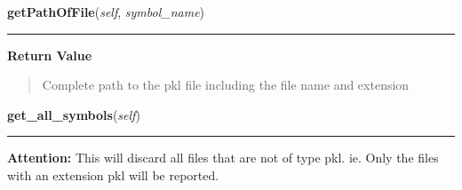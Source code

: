     \vspace{0.5ex}

\hspace{.8\funcindent}\begin{boxedminipage}{\funcwidth}

    \raggedright \textbf{getPathOfFile}(\textit{self}, \textit{symbol\_name})

    \vspace{-1.5ex}

    \rule{\textwidth}{0.5\fboxrule}
\setlength{\parskip}{2ex}
\setlength{\parskip}{1ex}
      \textbf{Return Value}
    \vspace{-1ex}

      \begin{quote}
      Complete path to the pkl file including the file name and extension

      \end{quote}

    \end{boxedminipage}

    \label{trunk:qstkutil:DataAccess:DataAccess:get_all_symbols}

    \vspace{0.5ex}

\hspace{.8\funcindent}\begin{boxedminipage}{\funcwidth}

    \raggedright \textbf{get\_all\_symbols}(\textit{self})

    \vspace{-1.5ex}

    \rule{\textwidth}{0.5\fboxrule}
\setlength{\parskip}{2ex}
\setlength{\parskip}{1ex}
\textbf{Attention:} This will discard all files that are not of type pkl. ie. Only the files 
with an extension pkl will be reported.



    \end{boxedminipage}

    \label{trunk:qstkutil:DataAccess:DataAccess:get_symbols_in_sublist}

